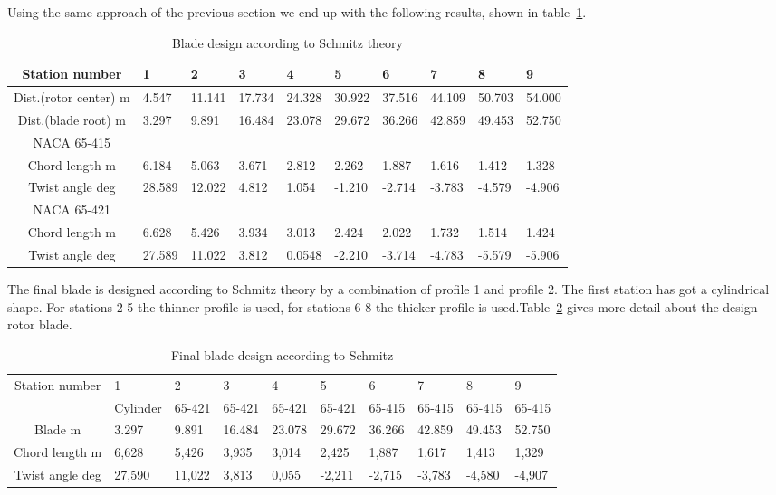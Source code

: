 \documentclass[10pt]{article}
\begin{document}
Using the same approach of the previous section we end up with the following results, shown in table~\ref{blade_design_schmitz}.
\begin{table}[H]
\begin{tabular}{c| l l l l l l l l l}
\hline
Station number & 	1&	2&	3	&4	&5	&6	&7	&8	&9\\
\hline
Dist.(rotor center)	m&	4.547&	11.141&	17.734&	24.328&	30.922&	37.516&	44.109&	50.703&	54.000\\
Dist.(blade root)	m&	3.297&	9.891&	16.484&	23.078&	29.672&	36.266&	42.859&	49.453&	52.750\\
\hline
NACA 65-415\\
\hline
Chord length	m&		6.184 & 5.063 &	3.671&	2.812 & 2.262 & 1.887 & 1.616 &	1.412&	1.328\\
Twist angle	deg	&	28.589	& 12.022 &	4.812 &	1.054 &	-1.210 &	-2.714 &	-3.783	& -4.579 &	-4.906\\
\hline
NACA 65-421\\
\hline
Chord length	m	&	6.628&	5.426&	3.934&	3.013&	2.424&	2.022	&1.732&	1.514&	1.424\\
Twist angle	deg	&	27.589&	11.022&	3.812&	0.0548	&-2.210&	-3.714&-4.783&	-5.579	&-5.906\\
\hline
\end{tabular}
\caption{Blade design according to Schmitz theory}
\label{blade_design_schmitz}
\end{table}
The final blade is designed according to Schmitz theory by a combination of profile 1 and profile 2. The first station has got a cylindrical shape. For stations 2-5 the thinner profile is used, for stations 6-8 the thicker profile is used.Table~\ref{final_blade_design_schmitz} gives more detail about the design rotor blade.
\begin{table}[H]
\begin{tabular}{c| l l l l l l l l l}
\hline
Station number & 	1&	2&	3	&4	&5	&6	&7	&8	&9\\
&Cylinder&65-421&65-421&65-421&65-421& 65-415& 65-415& 65-415&65-415\\
\hline
Blade	m&	3.297&	9.891&	16.484&	23.078&	29.672&	36.266&	42.859&	49.453&	52.750\\
\hline
Chord length	m&	6,628	&5,426&	3,935	&3,014&	2,425&	1,887&	1,617&	1,413&	1,329\\
Twist angle	deg	&	27,590&	11,022&	3,813&	0,055&	-2,211&	-2,715&	-3,783&	-4,580&	-4,907\\
\hline
\end{tabular}
\caption{Final blade design according to Schmitz}
\label{final_blade_design_schmitz}
\end{table}
\end{document}
